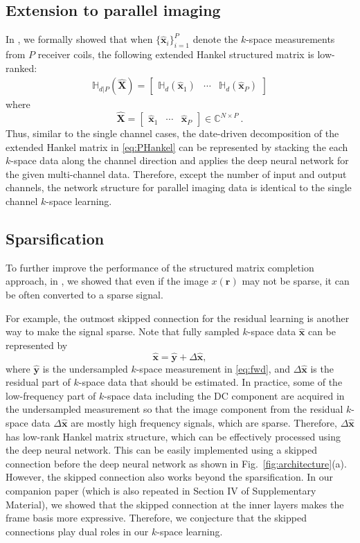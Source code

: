 \documentclass[10pt,journal]{IEEEtran}
\newcommand{\Xb}{{\mathbf X}}
\newcommand{\rb}{{\mathbf r}}
\newcommand{\xb}{{\mathbf x}}
\newcommand{\yb}{{\mathbf y}}
\newcommand{\Cd}{{\mathbb C}}
\newcommand{\0}{{\boldsymbol{0}}}
\newcommand{\hank}{\mathbb{H}}
\begin{document}
\subsection{Extension to parallel imaging}

In \cite{jin2016general}, we formally showed that when
$\{\hat \xb_i\}_{i=1}^P$ denote the $k$-space measurements from $P$ receiver coils,
the following extended Hankel structured matrix is low-ranked:
\begin{eqnarray}\label{eq:PHankel}
\hank_{d|P}(\widehat\Xb) = \begin{bmatrix} \hank_d(\widehat\xb_1) & \cdots & \hank_d(\widehat\xb_P) \end{bmatrix}
\end{eqnarray}
where $$\widehat\Xb=\begin{bmatrix} \widehat\xb_1 & \cdots & \widehat\xb_P \end{bmatrix} \in \Cd^{N\times P} \ .$$
Thus, similar to the single channel cases, the date-driven decomposition of the extended Hankel 
matrix in \eqref{eq:PHankel} can be represented by stacking the each $k$-space data along the channel
direction and applies the deep neural network for the given multi-channel data.
Therefore, except the number of input and output channels,  the network
structure for parallel imaging data is  identical to the single channel $k$-space learning. 






\subsection{Sparsification}


To further improve the performance of the structured matrix completion approach, in \cite{ye2016compressive}, we showed that 
even if the image $x(\rb)$ may not be sparse,   it can be often converted to a sparse signal.


 For example, the outmost skipped connection for the residual learning is another way to make the signal sparse.
Note that  fully sampled $k$-space data $\hat \xb$ can be represented by
$$\widehat \xb = \widehat\yb + \Delta \widehat\xb,$$
where $\widehat\yb$ is the undersampled $k$-space measurement in \eqref{eq:fwd},
and $\Delta\widehat \xb$ is the residual part of $k$-space data that should be estimated.
In practice, some of the low-frequency part of $k$-space data including the DC component
are acquired in the undersampled measurement so that the image component from the residual
$k$-space data $\Delta\widehat\xb$ are mostly high frequency signals, which are sparse. Therefore,
$\Delta\widehat\xb$ has low-rank Hankel matrix structure, which can be effectively processed using the deep neural network.
This can be easily implemented using a skipped connection  before the deep neural network as shown in Fig.~\ref{fig:architecture}(a).
However, the skipped connection also works beyond the sparsification.  
In our companion paper \cite{ye2019cnn} (which is also repeated in Section IV of Supplementary Material), we showed that
the skipped connection at the inner layers makes the  frame basis more expressive.
Therefore,  we conjecture that the skipped connections play dual roles in our $k$-space learning.
\end{document}
